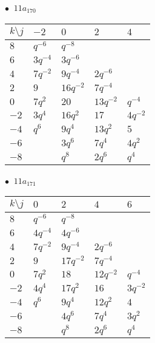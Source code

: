 \begin{minipage}{\linewidth}
$\bullet\ $ $11a_{170}$ \vspace{0.5em} \\
\begin{tabular}{l|llll}
$k \setminus j$ & $-2$ & $0$ & $2$ & $4$ \\
\hline
$8$ & $q^{-6}$ & $q^{-8}$ &  &  \\
$6$ & $3q^{-4}$ & $3q^{-6}$ &  &  \\
$4$ & $7q^{-2}$ & $9q^{-4}$ & $2q^{-6}$ &  \\
$2$ & $9$ & $16q^{-2}$ & $7q^{-4}$ &  \\
$0$ & $7q^{2}$ & $20$ & $13q^{-2}$ & $q^{-4}$ \\
$-2$ & $3q^{4}$ & $16q^{2}$ & $17$ & $4q^{-2}$ \\
$-4$ & $q^{6}$ & $9q^{4}$ & $13q^{2}$ & $5$ \\
$-6$ &  & $3q^{6}$ & $7q^{4}$ & $4q^{2}$ \\
$-8$ &  & $q^{8}$ & $2q^{6}$ & $q^{4}$ \\
\end{tabular}
\vspace{2em}
\end{minipage}
%
\begin{minipage}{\linewidth}
$\bullet\ $ $11a_{171}$ \vspace{0.5em} \\
\begin{tabular}{l|llll}
$k \setminus j$ & $0$ & $2$ & $4$ & $6$ \\
\hline
$8$ & $q^{-6}$ & $q^{-8}$ &  &  \\
$6$ & $4q^{-4}$ & $4q^{-6}$ &  &  \\
$4$ & $7q^{-2}$ & $9q^{-4}$ & $2q^{-6}$ &  \\
$2$ & $9$ & $17q^{-2}$ & $7q^{-4}$ &  \\
$0$ & $7q^{2}$ & $18$ & $12q^{-2}$ & $q^{-4}$ \\
$-2$ & $4q^{4}$ & $17q^{2}$ & $16$ & $3q^{-2}$ \\
$-4$ & $q^{6}$ & $9q^{4}$ & $12q^{2}$ & $4$ \\
$-6$ &  & $4q^{6}$ & $7q^{4}$ & $3q^{2}$ \\
$-8$ &  & $q^{8}$ & $2q^{6}$ & $q^{4}$ \\
\end{tabular}
\vspace{2em}
\end{minipage}
%
